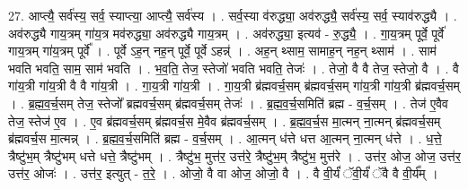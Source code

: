 \documentclass[17pt]{extarticle}
\begin{document}
27. आप्त्यै॒ सर्व॑स्य॒ सर्व॒ स्याप्त्या॒ आप्त्यै॒ सर्व॑स्य । . सर्व॒स्या व॑रुद्ध्या॒ अव॑रुद्ध्यै॒ सर्व॑स्य॒ सर्व॒ स्याव॑रुद्ध्यै । . अव॑रुद्ध्यै गाय॒त्रम् गा॑य॒त्र मव॑रुद्ध्या॒ अव॑रुद्ध्यै गाय॒त्रम् । . अव॑रुद्ध्या॒ इत्यव॑ - रु॒द्ध्यै॒ । . गा॒य॒त्रम् पूर्वे॒ पूर्वे॑ गाय॒त्रम् गा॑य॒त्रम् पूर्वे᳚ । . पूर्वे ऽह॒न् नह॒न् पूर्वे॒ पूर्वे ऽहन्न्॑ । . अह॒न् थ्साम॒ सामाह॒न् नह॒न् थ्साम॑ । . साम॑ भवति भवति॒ साम॒ साम॑ भवति । . भ॒व॒ति॒ तेज॒ स्तेजो॑ भवति भवति॒ तेजः॑ । . तेजो॒ वै वै तेज॒ स्तेजो॒ वै । . वै गा॑य॒त्री गा॑य॒त्री वै वै गा॑य॒त्री । . गा॒य॒त्री गा॑य॒त्री । . गा॒य॒त्री ब्र॑ह्मवर्च॒सम् ब्र॑ह्मवर्च॒सम् गा॑य॒त्री गा॑य॒त्री ब्र॑ह्मवर्च॒सम् । . ब्र॒ह्म॒व॒र्च॒सम् तेज॒ स्तेजो᳚ ब्रह्मवर्च॒सम् ब्र॑ह्मवर्च॒सम् तेजः॑ । . ब्र॒ह्म॒व॒र्च॒समिति॑ ब्रह्म - व॒र्च॒सम् । . तेज॑ ए॒वैव तेज॒ स्तेज॑ ए॒व । . ए॒व ब्र॑ह्मवर्च॒सम् ब्र॑ह्मवर्च॒स मे॒वैव ब्र॑ह्मवर्च॒सम् । . ब्र॒ह्म॒व॒र्च॒स मा॒त्मन् ना॒त्मन् ब्र॑ह्मवर्च॒सम् ब्र॑ह्मवर्च॒स मा॒त्मन्न् । . ब्र॒ह्म॒व॒र्च॒समिति॑ ब्रह्म - व॒र्च॒सम् । . आ॒त्मन् ध॑त्ते धत्त आ॒त्मन् ना॒त्मन् ध॑त्ते । . ध॒त्ते॒ त्रैष्टु॑भ॒म् त्रैष्टु॑भम् धत्ते धत्ते॒ त्रैष्टु॑भम् । . त्रैष्टु॑भ॒ मुत्त॑र॒ उत्त॑रे॒ त्रैष्टु॑भ॒म् त्रैष्टु॑भ॒ मुत्त॑रे । . उत्त॑र॒ ओज॒ ओज॒ उत्त॑र॒ उत्त॑र॒ ओजः॑ । . उत्त॑र॒ इत्युत् - त॒रे॒ । . ओजो॒ वै वा ओज॒ ओजो॒ वै । . वै वी॒र्यं॑ ॅवी॒र्यं॑ ॅवै वै वी॒र्य᳚म् । \newline
\end{document}
